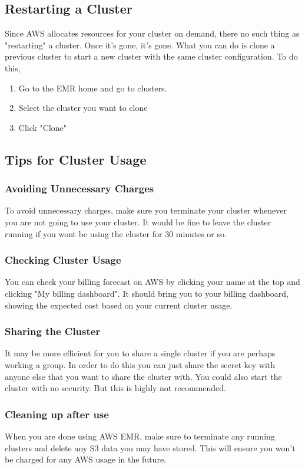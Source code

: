 \documentclass{article}
\begin{document}
\subsection{Restarting a Cluster}
Since AWS allocates resources for your cluster on demand, there no such thing as "restarting" a cluster. Once it's gone, it's gone. What you can do is clone a previous cluster to start a new cluster with the same cluster configuration. To do this, 
\begin{enumerate}
    \item Go to the EMR home and go to clusters. 
    \item Select the cluster you want to clone
    \item Click "Clone"
\end{enumerate}
\subsection{Tips for Cluster Usage}
\subsubsection{Avoiding Unnecessary Charges}
To avoid unnecessary charges, make sure you terminate your cluster whenever you are not going to use your cluster. It would be fine to leave the cluster running if you wont be using the cluster for 30 minutes or so. 
\subsubsection{Checking Cluster Usage}
You can check your billing forecast on AWS by clicking your name at the top and clicking "My billing dashboard". It should bring you to your billing dashboard, showing the expected cost based on your current cluster usage.
\subsubsection{Sharing the Cluster}
It may be more efficient for you to share a single cluster if you are perhaps working a group. In order to do this you can just share the secret key with anyone else that you want to share the cluster with. You could also start the cluster with no security. But this is highly not recommended.
\subsubsection{Cleaning up after use}
When you are done using AWS EMR, make sure to terminate any running clusters and delete any S3 data you may have stored. This will ensure you won't be charged for any AWS usage in the future.
\end{document}
